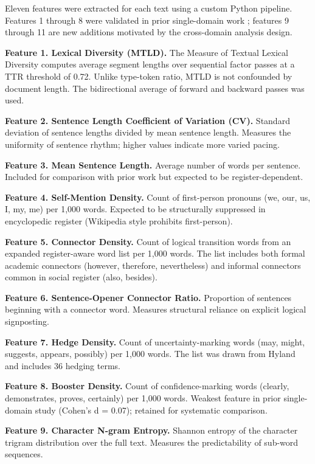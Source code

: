\documentclass{article}
\begin{document}
Eleven features were extracted for each text using a custom Python pipeline. Features 1 through 8 were validated in prior single-domain work \cite{ref8}; features 9 through 11 are new additions motivated by the cross-domain analysis design.

\textbf{Feature 1. Lexical Diversity (MTLD).} The Measure of Textual Lexical Diversity \cite{ref19} computes average segment lengths over sequential factor passes at a TTR threshold of 0.72. Unlike type-token ratio, MTLD is not confounded by document length. The bidirectional average of forward and backward passes was used.

\textbf{Feature 2. Sentence Length Coefficient of Variation (CV).} Standard deviation of sentence lengths divided by mean sentence length. Measures the uniformity of sentence rhythm; higher values indicate more varied pacing.

\textbf{Feature 3. Mean Sentence Length.} Average number of words per sentence. Included for comparison with prior work but expected to be register-dependent.

\textbf{Feature 4. Self-Mention Density.} Count of first-person pronouns (we, our, us, I, my, me) per 1,000 words. Expected to be structurally suppressed in encyclopedic register (Wikipedia style prohibits first-person).

\textbf{Feature 5. Connector Density.} Count of logical transition words from an expanded register-aware word list per 1,000 words. The list includes both formal academic connectors (however, therefore, nevertheless) and informal connectors common in social register (also, besides).

\textbf{Feature 6. Sentence-Opener Connector Ratio.} Proportion of sentences beginning with a connector word. Measures structural reliance on explicit logical signposting.

\textbf{Feature 7. Hedge Density.} Count of uncertainty-marking words (may, might, suggests, appears, possibly) per 1,000 words. The list was drawn from Hyland \cite{ref10} and includes 36 hedging terms.

\textbf{Feature 8. Booster Density.} Count of confidence-marking words (clearly, demonstrates, proves, certainly) per 1,000 words. Weakest feature in prior single-domain study (Cohen's d = 0.07); retained for systematic comparison.

\textbf{Feature 9. Character N-gram Entropy.} Shannon entropy of the character trigram distribution over the full text. Measures the predictability of sub-word sequences.
\end{document}
